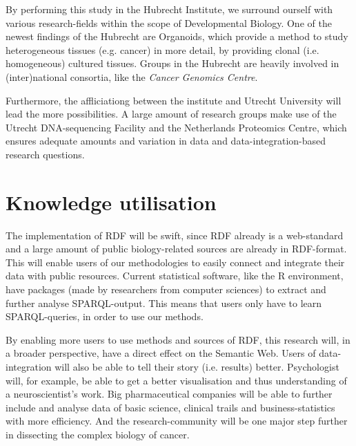 \documentclass[twoside,fontsize=10pt]{article}
\begin{document}
By performing this study in the Hubrecht Institute, we surround ourself with various research-fields within the scope of Developmental Biology. One of the newest findings of the Hubrecht are Organoids, which provide a method to study heterogeneous tissues (e.g. cancer) in more detail, by providing clonal (i.e. homogeneous) cultured tissues. Groups in the Hubrecht are heavily involved in (inter)national consortia, like the \textit{Cancer Genomics Centre}.

Furthermore, the affliciationg between the institute and Utrecht University will lead the more possibilities. A large amount of research groups make use of the Utrecht DNA-sequencing Facility and the Netherlands Proteomics Centre, which ensures adequate amounts and variation in data and data-integration-based research questions.
\section*{Knowledge utilisation}
The implementation of RDF will be swift, since RDF already is a web-standard and a large amount of public biology-related sources are already in RDF-format. This will enable users of our methodologies to easily connect and integrate their data with public resources. Current statistical software, like the R environment, have packages (made by researchers from computer sciences) to extract and further analyse SPARQL-output. This means that users only have to learn SPARQL-queries, in order to use our methods.

By enabling more users to use methods and sources of RDF, this research will, in a broader perspective, have a direct effect on the Semantic Web. Users of data-integration will also be able to tell their story (i.e. results) better. Psychologist will, for example, be able to get a better visualisation and thus understanding of a neuroscientist's work. Big pharmaceutical companies will be able to further include and analyse data of basic science, clinical trails and business-statistics with more efficiency. And the research-community will be one major step further in dissecting the complex biology of cancer.


%
%
%
\end{document}
